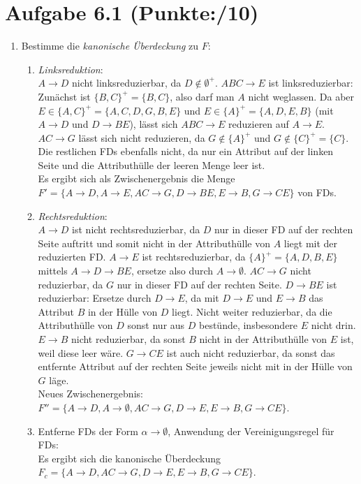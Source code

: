 \documentclass[11pt, a4paper]{article}
\newcommand{\blattnummer}{6}
\newcommand{\p}{10}
\newcommand{\aufgabe}[2] {\section*{Aufgabe \blattnummer.#1 (Punkte:\qquad/#2)}}
\begin{document}
\aufgabe{1}{\p}
\begin{enumerate}
\item Bestimme die \textit{kanonische Überdeckung} zu $F$:
\begin{enumerate}
\item \textit{Linksreduktion}:\\
$A \rightarrow D$ nicht linksreduzierbar, da $D \notin \emptyset^+$. $ABC \rightarrow E$ ist linksreduzierbar: Zunächst ist $\{ B,C\}^+=\{B,C\}$, also darf man $A$ nicht weglassen.
Da aber $E \in\{ A,C\}^+=\{ A,C,D,G,B,E\}$ und $E \in \{ A\}^+= \{ A,D,E,B\}$ (mit $A \rightarrow D$ und $D \rightarrow BE$), lässt sich $ABC \rightarrow E$ reduzieren auf $A
\rightarrow E$. $AC \rightarrow G$ lässt sich nicht reduzieren, da $G \notin \{ A\}^+$ und $G \notin \{ C\}^+=\{ C\}$. Die restlichen FDs ebenfalls nicht, da nur ein Attribut auf der linken
Seite und die Attributhülle der leeren Menge leer ist.\\
Es ergibt sich als Zwischenergebnis die Menge $F' = \{ A \rightarrow D, A \rightarrow E, AC \rightarrow G, D \rightarrow BE, E \rightarrow B, G \rightarrow CE\}$ von FDs.
\item \textit{Rechtsreduktion}:\\
$A \rightarrow D$ ist nicht rechtsreduzierbar, da $D$ nur in dieser FD auf der rechten Seite auftritt und somit nicht in der Attributhülle von $A$ liegt mit der reduzierten FD. $A \rightarrow E$
ist rechtsreduzierbar, da $\{ A\}^+= \{ A,D,B,E\}$ mittels $A \rightarrow D \rightarrow BE$, ersetze also durch $A \rightarrow \emptyset$. $AC \rightarrow G$ nicht reduzierbar, da $G$
nur in dieser FD auf der rechten Seite. $D \rightarrow BE$ ist reduzierbar: Ersetze durch $D \rightarrow E$, da mit $D\rightarrow E$ und $E \rightarrow B$ das Attribut $B$ in der Hülle von
$D$ liegt. Nicht weiter reduzierbar, da die Attributhülle von $D$ sonst nur aus $D$ bestünde, insbesondere $E$ nicht drin. $E \rightarrow B$ nicht reduzierbar, da sonst $B$ nicht in der
Attributhülle von $E$ ist, weil diese leer wäre. $G \rightarrow CE$ ist auch nicht reduzierbar, da sonst das entfernte Attribut auf der rechten Seite jeweils nicht mit in der Hülle von $G$ läge.\\
Neues Zwischenergebnis: $F''=\{ A \rightarrow D, A \rightarrow \emptyset, AC \rightarrow G, D \rightarrow E, E \rightarrow B, G \rightarrow CE\}$.
\item Entferne FDs der Form $\alpha \rightarrow \emptyset$, Anwendung der Vereinigungsregel für FDs:\\
Es ergibt sich die kanonische Überdeckung $F_c=\{ A \rightarrow D, AC \rightarrow G, D \rightarrow E, E \rightarrow B, G \rightarrow CE\}$.
\end{enumerate}


\end{enumerate}
\end{document}
